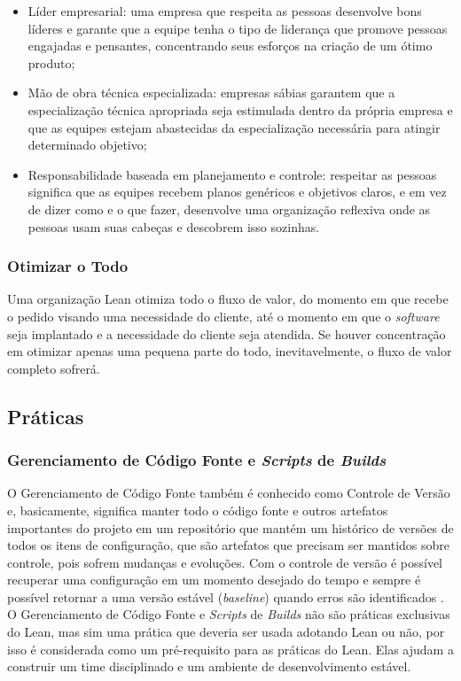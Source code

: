 \begin{itemize}
\item Líder empresarial: uma empresa que respeita as pessoas desenvolve bons líderes e garante que a equipe tenha o tipo de liderança que promove pessoas engajadas e pensantes, concentrando seus esforços na criação de um ótimo produto;
\item Mão de obra técnica especializada: empresas sábias garantem que a especialização técnica apropriada seja estimulada dentro da própria empresa e que as equipes estejam abastecidas da especialização necessária para atingir determinado objetivo;
\item Responsabilidade baseada em planejamento e controle: respeitar as pessoas significa que as equipes recebem planos genéricos e objetivos claros, e em vez de dizer como e o que fazer, desenvolve uma organização reflexiva onde as pessoas usam suas cabeças e descobrem isso sozinhas.
\end{itemize}

\subsubsection[Otimizar o Todo]{Otimizar o Todo}

Uma organização Lean otimiza todo o fluxo de valor, do momento em que recebe o pedido visando uma necessidade do cliente, até o momento em que o \textit{software} seja implantado e a necessidade do cliente seja atendida. Se houver concentração em otimizar apenas uma pequena parte do todo, inevitavelmente, o fluxo de valor completo sofrerá. 

\subsection[ Práticas]{ Práticas}

\subsubsection[Gerenciamento de Código Fonte e \textit{Scripts} de \textit{Builds}]{Gerenciamento de Código Fonte e \textit{Scripts} de \textit{Builds}}

O Gerenciamento de Código Fonte também é conhecido como Controle de Versão e, basicamente, significa manter todo o código fonte e outros artefatos importantes do projeto em um repositório que mantém um histórico de versões de todos os itens de configuração, que são artefatos que precisam ser mantidos sobre controle, pois sofrem mudanças e evoluções. Com o controle de versão é possível recuperar uma configuração em um momento desejado do tempo e sempre é possível retornar a uma versão estável (\textit{baseline}) quando erros são identificados \cite{hibbs2009}. O Gerenciamento de Código Fonte e \textit{Scripts} de \textit{Builds} não são práticas exclusivas do Lean, mas sim uma prática que deveria ser usada adotando Lean ou não, por isso é considerada como um pré-requisito para as práticas do Lean. Elas ajudam a construir um time disciplinado e um ambiente de desenvolvimento estável.

